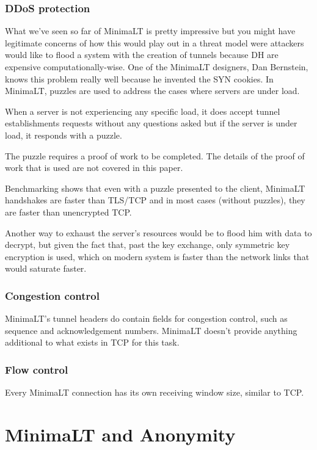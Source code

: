 \documentclass{vldb}
\begin{document}
\subsubsection{DDoS protection}

What we've seen so far of MinimaLT is pretty impressive but you might have legitimate concerns of how this would play out in a threat model were attackers would like to flood a system with the creation of tunnels because DH are expensive computationally-wise. One of the MinimaLT designers, Dan Bernstein, knows this problem really well because he invented the SYN cookies. In MinimaLT, puzzles are used to address the cases where servers are under load.

When a server is not experiencing any specific load, it does accept tunnel establishments requests without any questions asked but if the server is under load, it responds with a puzzle.

The puzzle requires a proof of work to be completed. The details of the proof of work that is used are not covered in this paper.

Benchmarking shows that even with a puzzle presented to the client, MinimaLT handshakes are faster than TLS/TCP and in most cases (without puzzles), they are faster than unencrypted TCP.\cite{MinimaLT}

Another way to exhaust the server's resources would be to flood him with data to decrypt, but given the fact that, past the key exchange, only symmetric key encryption is used, which on modern system is faster than the network links that would saturate faster.

\subsubsection{Congestion control}

MinimaLT's tunnel headers do contain fields for congestion control, such as sequence and acknowledgement numbers. MinimaLT doesn't provide anything additional to what exists in TCP for this task.

\subsubsection{Flow control}

Every MinimaLT connection has its own receiving window size, similar to TCP. 

\section{MinimaLT and Anonymity}
\end{document}
